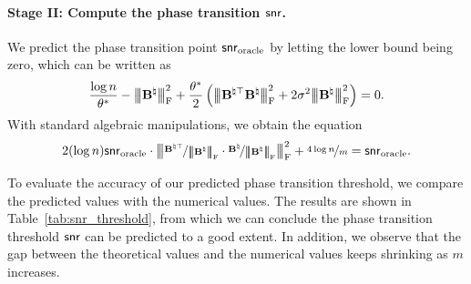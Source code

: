 \documentclass[11pt]{article}
\def \bBtrue {\bB^{\natural}}
\begin{document}
\paragraph{Stage II: Compute the phase transition $\mathsf{snr}$.}
We predict the phase transition point $\mathsf{snr}_{\textup{oracle}}$
by letting the lower bound being zero, which can be written as
\[
\frac{\log n}{\theta^*} - \Fnorm{\bBtrue}^2 +
\frac{\theta^*}{2} \bracket{\Fnorm{\bB^{\natural \rmt} \bBtrue}^2 + 2\sigma^2 \Fnorm{\bBtrue}^2}
= 0.
\]
With standard algebraic manipulations, we obtain the equation
\begin{align}
\label{eq:snr_oracle_phase_transition}
2(\log n)\snr_{\textup{oracle}}\cdot
\Fnorm{\nfrac{\bB^{\natural\rmt}}{\Fnorm{\bBtrue}}\cdot  \nfrac{\bBtrue}{\Fnorm{\bBtrue}}}^2
+ \nfrac{4\log n}{m} = \snr_{\textup{oracle}}.
\end{align}



To evaluate the accuracy of our predicted phase
transition threshold, we compare the predicted values with the numerical values.
The results are shown in Table~\ref{tab:snr_threshold}, from which we can conclude the phase transition threshold $\mathsf{snr}$ can be predicted to a good extent. In addition, we observe that the gap between the theoretical values and the numerical values keeps shrinking as $m$ increases.
%
\end{document}
